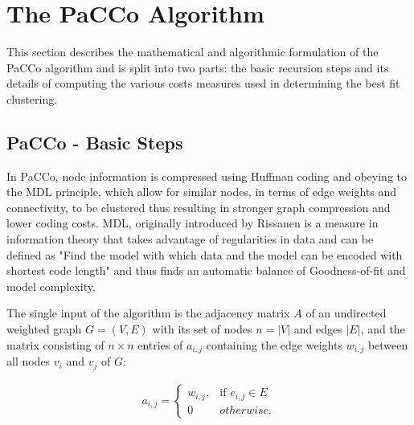 \documentclass[12pt,journal,compsoc]{IEEEtran}
\numberwithin{equation}{section}
\begin{document}
\section{The PaCCo Algorithm}
This section describes the mathematical and algorithmic formulation of the PaCCo algorithm and is split into two parts: the basic recursion steps and its details of computing the various costs measures used in determining the best fit clustering.







\subsection{PaCCo - Basic Steps}
In PaCCo, node information is compressed using Huffman coding and obeying to the MDL principle, which allow for similar nodes, in terms of edge weights and connectivity, to be clustered thus resulting in stronger graph compression and lower coding costs. 
MDL, originally introduced by Rissanen \cite{rissanen1978modeling} is a measure in information theory that takes advantage of regularities in data and can be defined as "Find the model with which data and the
model can be encoded with shortest code length" \cite{MLencylopediaMDL} and thus finds an automatic balance of Goodness-of-fit and model complexity.

The single input of the algorithm is the adjacency matrix  $A$ of an undirected weighted graph $ G=(V,E)$ with its set of nodes $ n = |V| $  and edges $ |E| $, and the matrix consisting of $n \times n$ entries of $a_{i,j} $ containing the edge weights $ w_{i,j} $ between all nodes $ v_{i}$ and $ v_{j}$ of $G$: 

	\begin{align}
		a_{i,j}=
		\left\{
			\begin{array}{ll}
				w_{i,j},  & \mbox{if } e_{i,j} \in E \\
				0 & otherwise.
			\end{array}
		\right.
	\end{align}
\end{document}
